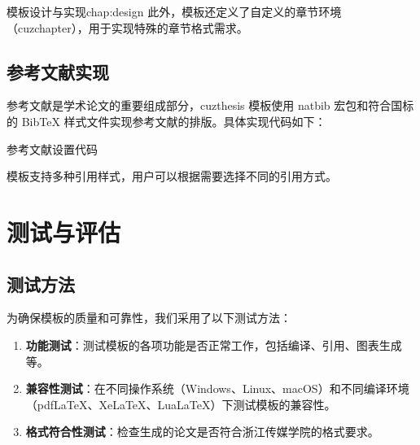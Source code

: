 \begin{cuzchapter}{模板设计与实现}{chap:design}
    此外，模板还定义了自定义的章节环境（cuzchapter），用于实现特殊的章节格式需求。
    
    \subsection{参考文献实现}
    
    参考文献是学术论文的重要组成部分，cuzthesis 模板使用 natbib 宏包和符合国标的 BibTeX 样式文件实现参考文献的排版。具体实现代码如下：
    
    \begin{listing}[htbp]
        \caption{参考文献设置代码}
        \label{code:bibliography}
        \begin{texcode}
            
            \setlength{\bibsep}{0.5ex}
            \renewcommand{\bibfont}{\small}
        \end{texcode}
    \end{listing}
    
    模板支持多种引用样式，用户可以根据需要选择不同的引用方式。
    
    \section{测试与评估}\label{sec:testing-evaluation}
    
    \subsection{测试方法}
    
    为确保模板的质量和可靠性，我们采用了以下测试方法：
    
    \begin{enumerate}
        \item \textbf{功能测试}：测试模板的各项功能是否正常工作，包括编译、引用、图表生成等。
        
        \item \textbf{兼容性测试}：在不同操作系统（Windows、Linux、macOS）和不同编译环境（pdfLaTeX、XeLaTeX、LuaLaTeX）下测试模板的兼容性。
        
        \item \textbf{格式符合性测试}：检查生成的论文是否符合浙江传媒学院的格式要求。
        

\end{enumerate}
\end{cuzchapter}
